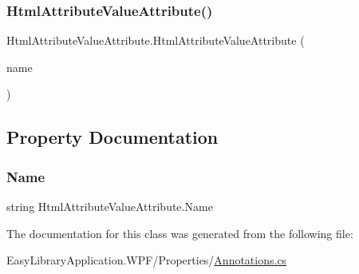 \subsubsection{\texorpdfstring{Html\+Attribute\+Value\+Attribute()}{HtmlAttributeValueAttribute()}}
{\footnotesize\ttfamily Html\+Attribute\+Value\+Attribute.\+Html\+Attribute\+Value\+Attribute (\begin{DoxyParamCaption}\item[{\mbox{[}\+Not\+Null\mbox{]} string}]{name }\end{DoxyParamCaption})}



\subsection{Property Documentation}
\mbox{\label{class_html_attribute_value_attribute_ae46f5471839e8bf67fe5177f2b01e514}} 
\subsubsection{\texorpdfstring{Name}{Name}}
{\footnotesize\ttfamily string Html\+Attribute\+Value\+Attribute.\+Name\hspace{0.3cm}{\ttfamily [get]}}



The documentation for this class was generated from the following file\+:\begin{DoxyCompactItemize}
\item 
Easy\+Library\+Application.\+W\+P\+F/\+Properties/\mbox{\hyperlink{_annotations_8cs}{Annotations.\+cs}}\end{DoxyCompactItemize}
